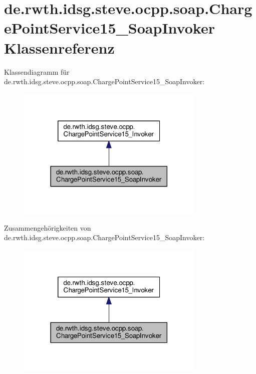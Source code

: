 \hypertarget{classde_1_1rwth_1_1idsg_1_1steve_1_1ocpp_1_1soap_1_1_charge_point_service15___soap_invoker}{\section{de.\-rwth.\-idsg.\-steve.\-ocpp.\-soap.\-Charge\-Point\-Service15\-\_\-\-Soap\-Invoker Klassenreferenz}
\label{classde_1_1rwth_1_1idsg_1_1steve_1_1ocpp_1_1soap_1_1_charge_point_service15___soap_invoker}
}


Klassendiagramm für de.\-rwth.\-idsg.\-steve.\-ocpp.\-soap.\-Charge\-Point\-Service15\-\_\-\-Soap\-Invoker\-:
\nopagebreak
\begin{figure}[H]
\begin{center}
\leavevmode
\includegraphics[width=254pt]{classde_1_1rwth_1_1idsg_1_1steve_1_1ocpp_1_1soap_1_1_charge_point_service15___soap_invoker__inherit__graph}
\end{center}
\end{figure}


Zusammengehörigkeiten von de.\-rwth.\-idsg.\-steve.\-ocpp.\-soap.\-Charge\-Point\-Service15\-\_\-\-Soap\-Invoker\-:
\nopagebreak
\begin{figure}[H]
\begin{center}
\leavevmode
\includegraphics[width=254pt]{classde_1_1rwth_1_1idsg_1_1steve_1_1ocpp_1_1soap_1_1_charge_point_service15___soap_invoker__coll__graph}
\end{center}
\end{figure}
